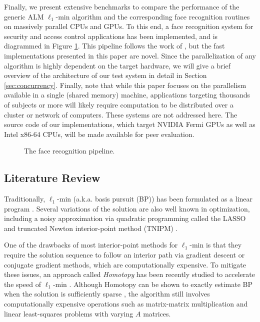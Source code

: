 \documentclass[preprint]{sigplanconf}
\begin{document}
Finally, we present extensive benchmarks to compare the performance of the
generic ALM $\ell_1$-min algorithm and the corresponding face recognition
routines on massively parallel CPUs and GPUs.  To this end, a face
recognition system for security and access control applications has been implemented, 
and is diagrammed in Figure \ref{fig:pipeline}. This pipeline follows the work of \cite{WagnerA2011-PAMI}, but
the fast implementations presented in this paper are novel.
Since the parallelization of any algorithm
is highly dependent on the target hardware, we will give a brief overview of
the architecture of our test system in detail in Section
\ref{sec:concurrency}.
Finally, note that 
while this paper focuses on the parallelism available in a single (shared memory) machine,
applications targeting thousands of subjects or more will likely require computation to be
distributed over a cluster or network of computers. These systems are not addressed here.
The source code of our implementations, which target NVIDIA Fermi GPUs
as well as Intel x86-64 CPUs, will be made available for peer evaluation.
\begin{figure}
\centering
{\tiny }
\caption{The face recognition pipeline.\vspace{-0.1in}}
\label{fig:pipeline}
\end{figure}


\subsection{Literature Review} \vspace{-0.06in}
Traditionally, $\ell_1$-min (a.k.a.
basis pursuit (BP)) has been formulated as a linear program
\cite{ChenS2001-SIAM}. Several variations of the solution are also well known
in optimization, including a noisy approximation via quadratic programming
called the LASSO \cite{TibshiraniR1996} and truncated Newton interior-point
method (TNIPM) \cite{KimS2007}.

One of the drawbacks of most interior-point methods for $\ell_1$-min is that they require the solution sequence to follow an
interior path via gradient descent or conjugate gradient methods, which are computationally expensive.
To mitigate these issues, an approach called \emph{Homotopy} has been recently studied to accelerate the
speed of $\ell_1$-min \cite{OsborneM2000,EfronB2004,MalioutovD2005,DonohoD2006}.
Although Homotopy can be shown to exactly estimate BP when the solution is
sufficiently sparse \cite{DonohoD2006}, the algorithm still involves
computationally expensive operations such as matrix-matrix multiplication and
linear least-squares problems with varying $A$
matrices.
\end{document}
